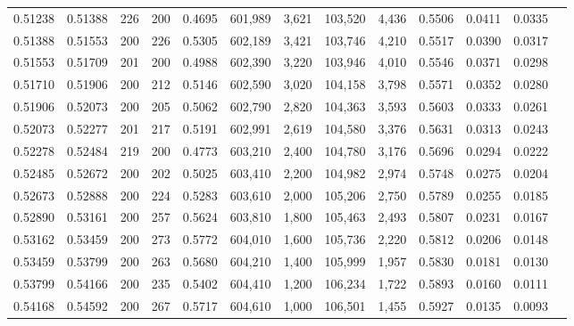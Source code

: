 \begin{tabular}{rrrrrrrrrrrrr}
0.51238 & 0.51388 &   226 & 200 &                                     0.4695 & 601,989 &   3,621 & 103,520 &   4,436 & 0.5506 & 0.0411 & 0.0335 \\
0.51388 & 0.51553 &   200 & 226 &                                     0.5305 & 602,189 &   3,421 & 103,746 &   4,210 & 0.5517 & 0.0390 & 0.0317 \\
0.51553 & 0.51709 &   201 & 200 &                                     0.4988 & 602,390 &   3,220 & 103,946 &   4,010 & 0.5546 & 0.0371 & 0.0298 \\
0.51710 & 0.51906 &   200 & 212 &                                     0.5146 & 602,590 &   3,020 & 104,158 &   3,798 & 0.5571 & 0.0352 & 0.0280 \\
0.51906 & 0.52073 &   200 & 205 &                                     0.5062 & 602,790 &   2,820 & 104,363 &   3,593 & 0.5603 & 0.0333 & 0.0261 \\
0.52073 & 0.52277 &   201 & 217 &                                     0.5191 & 602,991 &   2,619 & 104,580 &   3,376 & 0.5631 & 0.0313 & 0.0243 \\
0.52278 & 0.52484 &   219 & 200 &                                     0.4773 & 603,210 &   2,400 & 104,780 &   3,176 & 0.5696 & 0.0294 & 0.0222 \\
0.52485 & 0.52672 &   200 & 202 &                                     0.5025 & 603,410 &   2,200 & 104,982 &   2,974 & 0.5748 & 0.0275 & 0.0204 \\
0.52673 & 0.52888 &   200 & 224 &                                     0.5283 & 603,610 &   2,000 & 105,206 &   2,750 & 0.5789 & 0.0255 & 0.0185 \\
0.52890 & 0.53161 &   200 & 257 &                                     0.5624 & 603,810 &   1,800 & 105,463 &   2,493 & 0.5807 & 0.0231 & 0.0167 \\
0.53162 & 0.53459 &   200 & 273 &                                     0.5772 & 604,010 &   1,600 & 105,736 &   2,220 & 0.5812 & 0.0206 & 0.0148 \\
0.53459 & 0.53799 &   200 & 263 &                                     0.5680 & 604,210 &   1,400 & 105,999 &   1,957 & 0.5830 & 0.0181 & 0.0130 \\
0.53799 & 0.54166 &   200 & 235 &                                     0.5402 & 604,410 &   1,200 & 106,234 &   1,722 & 0.5893 & 0.0160 & 0.0111 \\
0.54168 & 0.54592 &   200 & 267 &                                     0.5717 & 604,610 &   1,000 & 106,501 &   1,455 & 0.5927 & 0.0135 & 0.0093 \\

\end{tabular}
